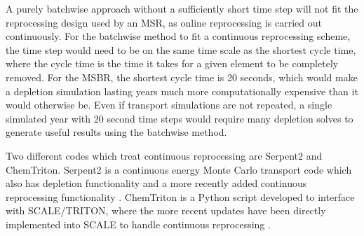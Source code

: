 A purely batchwise approach without a sufficiently short time step will not fit the reprocessing design used by an MSR, as online reprocessing is carried out continuously.
For the batchwise method to fit a continuous reprocessing scheme, the time step would need to be on the same time scale as the shortest cycle time, where the cycle time is the time it takes for a given element to be completely removed.
For the MSBR, the shortest cycle time is 20 seconds, which would make a depletion simulation lasting years much more computationally expensive than it would otherwise be.
Even if transport simulations are not repeated, a single simulated year with 20 second time steps would require many depletion solves to generate useful results using the batchwise method.



Two different codes which treat continuous reprocessing are Serpent2 and ChemTriton. Serpent2 is a continuous energy Monte Carlo transport code which also has depletion functionality and a more recently added continuous reprocessing functionality \cite{aufiero_extended_2013}. ChemTriton is a Python script developed to interface with SCALE/TRITON, where the more recent updates have been directly implemented into SCALE to handle continuous reprocessing \cite{jr_vicente_valdez_modeling_2020}.

